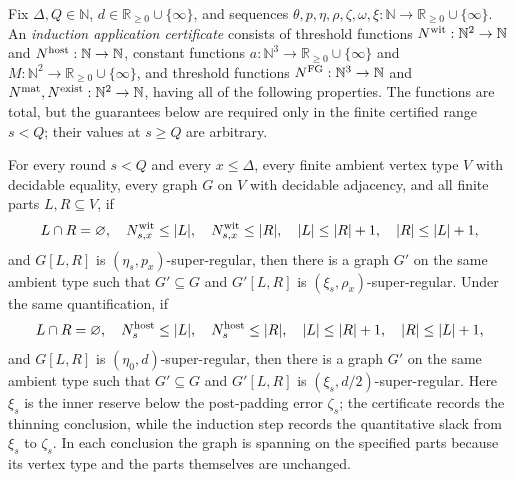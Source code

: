 \begin{definition}
Fix $\Delta,Q\in\mathbb N$, $d\in\mathbb R_{\geq0}\cup\{\infty\}$, and
sequences $\theta,p,\eta,\rho,\zeta,\omega,\xi:\mathbb N\to
\mathbb R_{\geq0}\cup\{\infty\}$.  An \emph{induction application
certificate} consists of threshold functions
$N^{\rm wit}:\mathbb N^2\to\mathbb N$ and $N^{\rm host}:\mathbb N\to\mathbb N$,
constant functions $a:\mathbb N^3\to\mathbb R_{\geq0}\cup\{\infty\}$ and
$M:\mathbb N^2\to\mathbb R_{\geq0}\cup\{\infty\}$, and threshold functions
$N^{\rm FG}:\mathbb N^3\to\mathbb N$ and
$N^{\rm mat},N^{\rm exist}:\mathbb N^2\to\mathbb N$, having all of the following
properties.  The functions are total, but the guarantees below are required
only in the finite certified range $s<Q$; their values at $s\geq Q$ are
arbitrary.

For every round $s<Q$ and every $x\leq\Delta$, every finite ambient vertex type $V$ with decidable
equality, every graph $G$ on $V$ with decidable adjacency, and all finite
parts $L,R\subseteq V$, if
\[
 L\cap R=\varnothing,\quad N^{\rm wit}_{s,x}\leq |L|,\quad
 N^{\rm wit}_{s,x}\leq |R|,\quad |L|\leq |R|+1,\quad |R|\leq |L|+1,
\]
and $G[L,R]$ is $(\eta_s,p_x)$-super-regular, then there is a graph $G'$ on
the same ambient type such that $G'\subseteq G$ and $G'[L,R]$ is
$(\xi_s,\rho_x)$-super-regular.  Under the same quantification, if
\[
 L\cap R=\varnothing,\quad N^{\rm host}_s\leq |L|,\quad
 N^{\rm host}_s\leq |R|,\quad |L|\leq |R|+1,\quad |R|\leq |L|+1,
\]
and $G[L,R]$ is $(\eta_0,d)$-super-regular, then there is a graph $G'$ on
the same ambient type such that $G'\subseteq G$ and $G'[L,R]$ is
$(\xi_s,d/2)$-super-regular.  Here $\xi_s$ is the inner reserve below the
post-padding error $\zeta_s$; the certificate records the thinning
conclusion, while the induction step records the quantitative slack from
$\xi_s$ to $\zeta_s$.  In each conclusion the graph is spanning on
the specified parts because its vertex type and the parts themselves are
unchanged.


\end{definition}
